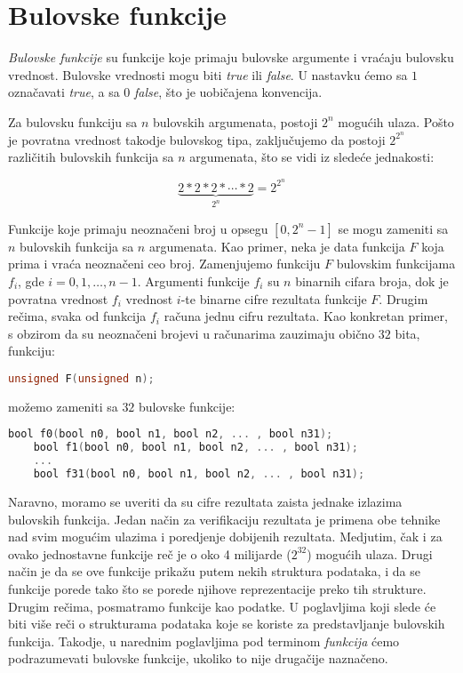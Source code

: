 \section{Bulovske funkcije}
\label{sec:BulovskeFunkcije}

\emph{Bulovske funkcije} su funkcije koje primaju bulovske argumente i vra\'c{}aju bulovsku vrednost. Bulovske vrednosti mogu biti \emph{true} ili \emph{false}. U nastavku \'c{}emo sa $1$ ozna\v{c}avati \emph{true}, a sa $0$ \emph{false}, \v{s}to je uobi\v{c}ajena konvencija.

Za bulovsku funkciju sa $n$ bulovskih argumenata, postoji $2^{n}$ mogu\'c{}ih ulaza. Po\v{s}to je povratna vrednost takodje bulovskog tipa, zaklju\v{c}ujemo da postoji $2^{2^{n}}$ razli\v{c}itih bulovskih funkcija sa $n$ argumenata, \v{s}to se vidi iz slede\'c{}e jednakosti:

\[ \underbrace{2*2*2* \dotsb *2}_{\text{$2^{n}$}} = 2^{2^{n}} \]

Funkcije koje primaju neozna\v{c}eni broj u opsegu $[0,2^{n}-1]$ se mogu zameniti sa $n$ bulovskih funkcija sa $n$ argumenata. Kao primer, neka je data funkcija $F$ koja prima i vra\'c{}a neozna\v{c}eni ceo broj. Zamenjujemo funkciju $F$ bulovskim funkcijama $f_i$, gde $i = 0, 1, \dots , n-1$. Argumenti funkcije $f_{i}$ su $n$ binarnih cifara broja, dok je povratna vrednost $f_{i}$ vrednost $i$-te binarne cifre rezultata funkcije $F$. Drugim re\v{c}ima, svaka od funkcija $f_{i}$ ra\v{c}una jednu cifru rezultata. Kao konkretan primer, s obzirom da su neozna\v{c}eni brojevi u ra\v{c}unarima zauzimaju obi\v{c}no $32$ bita, funkciju:

\begin{lstlisting}[language=C++]
    unsigned F(unsigned n);
\end{lstlisting}

\noindent mo\v{z}emo zameniti sa $32$ bulovske funkcije:

\begin{lstlisting}[language=C, emph={bool}]
    bool f0(bool n0, bool n1, bool n2, ... , bool n31);
    bool f1(bool n0, bool n1, bool n2, ... , bool n31);
    ...
    bool f31(bool n0, bool n1, bool n2, ... , bool n31);
\end{lstlisting}

Naravno, moramo se uveriti da su cifre rezultata zaista jednake izlazima bulovskih funkcija. Jedan na\v{c}in za verifikaciju rezultata je primena obe tehnike nad svim mogu\'c{}im ulazima i poredjenje dobijenih rezultata. Medjutim, \v{c}ak i za ovako jednostavne funkcije re\v{c} je o oko 4 milijarde ($2^{32}$) mogu\'c{}ih ulaza. Drugi na\v{c}in je da se ove funkcije prika\v{z}u putem nekih struktura podataka, i da se funkcije porede tako \v{s}to se porede njihove reprezentacije preko tih strukture. Drugim re\v{c}ima, posmatramo funkcije kao podatke. U poglavljima koji slede \'c{}e biti vi\v{s}e re\v{c}i o strukturama podataka koje se koriste za predstavljanje bulovskih funkcija. Takodje, u narednim poglavljima pod terminom \emph{funkcija} \'c{}emo podrazumevati bulovske funkcije, ukoliko to nije druga\v{c}ije nazna\v{c}eno.
